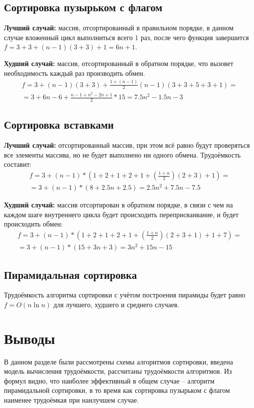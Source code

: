 \subsection{Сортировка пузырьком с флагом}
\label{subsec:bubble}
\textbf{Лучший случай:} массив, отсортированный в правильном порядке, в данном случае вложенный цикл выполниться всего 1 раз, после чего функция завершится $f=3+3+(n-1)(3+3)+1=6n+1$.

\textbf{Худший случай:} массив, отсортированный в обратном порядке, что вызовет необходимость каждый раз производить обмен.
\begin{equation}
\begin{split}
&f=3+(n-1)(3+3)+\frac{1+(n-1)}{2}(n-1)(3+3+5+3+1)=\\
&=3+6n-6+\frac{n-1+n^2-2n+1}{2}*15=7.5n^2-1.5n-3
\end{split}
\end{equation}
\subsection{Сортировка вставками}
\label{subsec:insertion}
\textbf{Лучший случай:} отсортированный массив, при этом всё равно будут проверяться все элементы массива, но не будет выполнено ни одного обмена. Трудоёмкость составит:
\begin{equation}
\begin{split}
&f=3+(n-1)*(1+2+1+2+1+(\frac{1+n}{2})(2+3)+1)=\\
&=3+(n-1)*(8+2.5n+2.5)=2.5n^2+7.5n-7.5
\end{split}
\end{equation}

\textbf{Худший случай:} массив отсортирован в обратном порядке, в связи с чем на каждом шаге внутреннего цикла будет происходить переприсваивание, и будет происходить обмен:
\begin{equation}
\begin{split}
&f=3+(n-1)*(1+2+1+2+1+(\frac{1+n}{2})(2+3+1)+1+7)=\\
&=3+(n-1)*(15+3n+3)=3n^2+15n-15
\end{split}
\end{equation}
\subsection{Пирамидальная сортировка}
\label{subsec:heap}
Трудоёмкость алгоритма сортировки с учётом построения пирамиды будет равно $f=O(n\ln n)$ для лучшего, худшего и среднего случаев.


\section{Выводы}
\label{sec:design_conclusion}
В данном разделе были рассмотрены схемы алгоритмов сортировки, введена модель вычисления трудоёмкости, рассчитаны трудоёмкости алгоритмов. Из формул видно, что наиболее эффективный в общем случае -- алгоритм пирамидальной сортировки, в то время как сортировка пузырьком с флагом наименее трудоёмкая при наилучшем случае.
